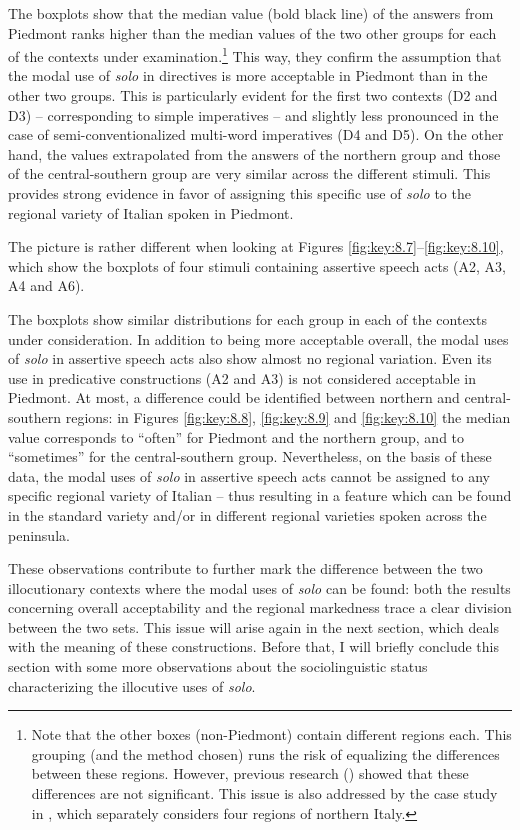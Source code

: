 The boxplots show that the median value (bold black line) of the answers from Piedmont ranks higher than the median values of the two other groups for each of the contexts under examination.{\footnote{Note that the other boxes (non-Piedmont) contain different regions each. This grouping (and the method chosen) runs the risk of equalizing the differences between these regions. However, previous research (\citealt{FavaroGoria2019}) showed that these differences are not significant. This issue is also addressed by the case study in , which separately considers four regions of northern Italy.}} This way, they confirm the assumption that the modal use of \textit{solo} in directives is more acceptable in Piedmont than in the other two groups. This is particularly evident for the first two contexts (D2 and D3) – corresponding to simple imperatives – and slightly less pronounced in the case of semi-conventionalized multi-word imperatives (D4 and D5). On the other hand, the values extrapolated from the answers of the northern group and those of the central-southern group are very similar across the different stimuli. This provides strong evidence in favor of assigning this specific use of \textit{solo} to the regional variety of Italian spoken in Piedmont. 

The picture is rather different when looking at Figures \ref{fig:key:8.7}–\ref{fig:key:8.10}, which show the boxplots of four stimuli containing assertive speech acts (A2, A3, A4 and A6).

The boxplots show similar distributions for each group in each of the contexts under consideration. In addition to being more acceptable overall, the modal uses of \textit{solo} in assertive speech acts also show almost no regional variation. Even its use in predicative constructions (A2 and A3) is not considered acceptable in Piedmont. At most, a difference could be identified between northern and central-southern regions: in Figures \ref{fig:key:8.8}, \ref{fig:key:8.9} and \ref{fig:key:8.10} the median value corresponds to “often” for Piedmont and the northern group, and to “sometimes” for the central-southern group. Nevertheless, on the basis of these data, the modal uses of \textit{solo} in assertive speech acts cannot be assigned to any specific regional variety of Italian – thus resulting in a feature which can be found in the standard variety and/or in different regional varieties spoken across the peninsula.\largerpage[2.25]

These observations contribute to further mark the difference between the two illocutionary contexts where the modal uses of \textit{solo} can be found: both the results concerning overall acceptability and the regional markedness trace a clear division between the two sets. This issue will arise again in the next section, which deals with the meaning of these constructions. Before that, I will briefly conclude this section with some more observations about the sociolinguistic status characterizing the illocutive uses of \textit{solo}.


